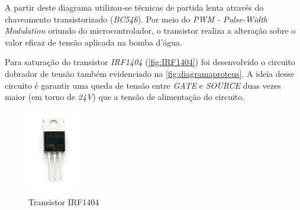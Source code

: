 A partir deste diagrama utilizou-se técnicas de partida lenta através do chaveamento transistorizado (\textit{BC546}). Por meio do \textit{PWM - Pulse-Width Modulation} oriundo do microcontrolador, o transistor realiza a alteração sobre o valor eficaz de tensão aplicada na bomba d'água.

Para saturação do transistor \textit{IRF1404} (\autoref{fig:IRF1404}) foi desenvolvido o circuito dobrador de tensão também evidenciado na \autoref{fig:diagramaproteus}. A ideia desse circuito é garantir uma queda de tensão entre \textit{GATE} e \textit{SOURCE} duas vezes maior (em torno de \textit{24V}) que a tensão de alimentação do circuito.

\begin{figure}[H]
	\centering
	\caption{Transistor IRF1404}
	\includegraphics[width=0.2\textwidth]{figuras/IRF1404.png}
	\label{fig:IRF1404}
\end{figure} 
